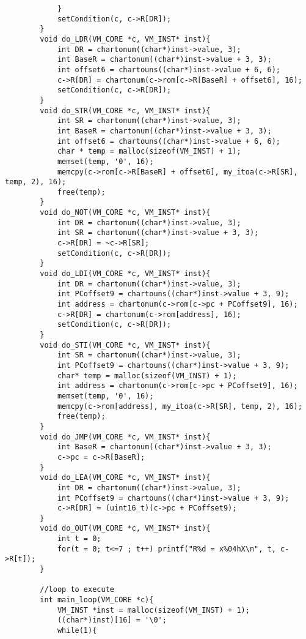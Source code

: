 \documentclass[20pt]{ctexart}
\begin{document}
\begin{verbatim}
            }
            setCondition(c, c->R[DR]);
        }
        void do_LDR(VM_CORE *c, VM_INST* inst){
            int DR = chartonum((char*)inst->value, 3);
            int BaseR = chartonum((char*)inst->value + 3, 3);
            int offset6 = chartouns((char*)inst->value + 6, 6);
            c->R[DR] = chartonum(c->rom[c->R[BaseR] + offset6], 16);
            setCondition(c, c->R[DR]);      
        }
        void do_STR(VM_CORE *c, VM_INST* inst){
            int SR = chartonum((char*)inst->value, 3);
            int BaseR = chartonum((char*)inst->value + 3, 3);
            int offset6 = chartouns((char*)inst->value + 6, 6);
            char * temp = malloc(sizeof(VM_INST) + 1);
            memset(temp, '0', 16);
            memcpy(c->rom[c->R[BaseR] + offset6], my_itoa(c->R[SR], temp, 2), 16);
            free(temp); 
        }
        void do_NOT(VM_CORE *c, VM_INST* inst){
            int DR = chartonum((char*)inst->value, 3);
            int SR = chartonum((char*)inst->value + 3, 3);
            c->R[DR] = ~c->R[SR];
            setCondition(c, c->R[DR]);    
        }
        void do_LDI(VM_CORE *c, VM_INST* inst){
            int DR = chartonum((char*)inst->value, 3);
            int PCoffset9 = chartouns((char*)inst->value + 3, 9);
            int address = chartonum(c->rom[c->pc + PCoffset9], 16);
            c->R[DR] = chartonum(c->rom[address], 16);
            setCondition(c, c->R[DR]);    
        }
        void do_STI(VM_CORE *c, VM_INST* inst){
            int SR = chartonum((char*)inst->value, 3);
            int PCoffset9 = chartouns((char*)inst->value + 3, 9);
            char* temp = malloc(sizeof(VM_INST) + 1);
            int address = chartonum(c->rom[c->pc + PCoffset9], 16);
            memset(temp, '0', 16);
            memcpy(c->rom[address], my_itoa(c->R[SR], temp, 2), 16);
            free(temp);    
        }
        void do_JMP(VM_CORE *c, VM_INST* inst){
            int BaseR = chartonum((char*)inst->value + 3, 3);
            c->pc = c->R[BaseR];
        }
        void do_LEA(VM_CORE *c, VM_INST* inst){
            int DR = chartonum((char*)inst->value, 3);
            int PCoffset9 = chartouns((char*)inst->value + 3, 9);
            c->R[DR] = (uint16_t)(c->pc + PCoffset9);
        }
        void do_OUT(VM_CORE *c, VM_INST* inst){
            int t = 0;
            for(t = 0; t<=7 ; t++) printf("R%d = x%04hX\n", t, c->R[t]);
        }

        //loop to execute
        int main_loop(VM_CORE *c){
            VM_INST *inst = malloc(sizeof(VM_INST) + 1);
            ((char*)inst)[16] = '\0';
            while(1){


\end{verbatim}
\end{document}
